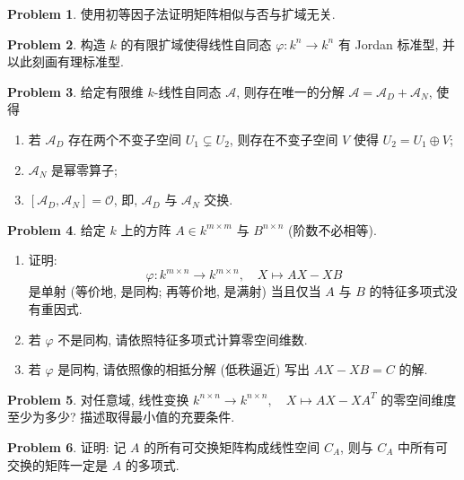 \documentclass{MainStyle}
\theoremstyle{definition}
\newtheorem{problem}{Problem}
\begin{document}
\begin{problem}
使用初等因子法证明矩阵相似与否与扩域无关.
\end{problem}

\begin{problem}
构造 $k$ 的有限扩域使得线性自同态 $\varphi :k^n\to k^n$ 有 Jordan 标准型, 并以此刻画有理标准型.
\end{problem}

\begin{problem}
给定有限维 $k$-线性自同态 $\mathscr A$, 则存在唯一的分解 $\mathscr A=\mathscr A_D+\mathscr A_N$, 使得
\begin{enumerate}
    \item 若 $\mathscr A_D$ 存在两个不变子空间 $U_1\subsetneq  U_2$, 则存在不变子空间 $V$ 使得 $U_2=U_1\oplus V$;
    \item $\mathscr A_N$ 是幂零算子;
    \item $[\mathscr A_D,\mathscr A_N]=\mathscr O$, 即, $\mathscr A_D$ 与 $\mathscr A_N$ 交换.
\end{enumerate}
\end{problem}

\begin{problem}
给定 $k$ 上的方阵 $A\in k^{m\times m}$ 与 $B^{n\times n}$ (阶数不必相等).
\begin{enumerate}
    \item 证明:
          \begin{equation}
              \varphi: k^{m\times n}\to k^{m\times n},\quad X\mapsto AX-XB
          \end{equation}
          是单射 (等价地, 是同构; 再等价地, 是满射) 当且仅当 $A$ 与 $B$ 的特征多项式没有重因式.
    \item 若 $\varphi$ 不是同构, 请依照特征多项式计算零空间维数.
    \item 若 $\varphi$ 是同构, 请依照像的相抵分解 (低秩逼近) 写出 $AX-XB=C$ 的解.
\end{enumerate}
\end{problem}

\begin{problem}
对任意域, 线性变换 $k^{n\times n}\to k^{n\times n},\quad X\mapsto AX-XA^T$ 的零空间维度至少为多少? 描述取得最小值的充要条件.
\end{problem}

\begin{problem}
证明: 记 $A$ 的所有可交换矩阵构成线性空间 $C_A$, 则与 $C_A$ 中所有可交换的矩阵一定是 $A$ 的多项式.
\end{problem}
\end{document}
